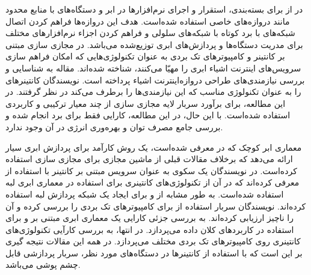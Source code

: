       در \cite{novo2015capillary} از  برای بسته‌بندی، استقرار و اجرای نرم‌افزار‌ها در ابر و دستگاه‌های با منابع محدود مانند دروازه‌های خاصی استفاده شده‌است.
      هدف این دروازه‌ها فراهم کردن اتصال شبکه‌های با برد کوتاه با شبکه‌های سلولی و فراهم کردن اجزاء نرم‌افزار‌های مختلف برای مدریت دستگاه‌ها و پردازش‌های ابری توزیع‌شده می‌باشد.
      در \cite{celesti2016exploring} مجازی سازی مبتنی بر کانتینر و کامپیوتر‌های تک بردی به عنوان تکنولوژی‌هایی که امکان فراهم سازی سرویس‌های اینترنت اشیاء ابری را مهیّا می‌کنند، شناخته شده‌اند.
      مقاله \cite{krylovskiy2015internet} به شناسایی و بررسی نیازمندی‌های طراحی دروازه‌اینترنت اشیاء پرداخته است.
      نویسندگان کانتینر‌های  را به عنوان تکنولوژی مناسب که این نیازمندی‌ها را برطرف می‌کند در نظر گرفتند.
      در این مطالعه، برای برآورد سربار لایه مجازی سازی از چند معیار ترکیبی و کاربردی استفاده شده‌است.
      با این حال، در این مطالعه، کارایی فقط برای برد  انجام شده و بررسی جامع مصرف توان و بهره‌وری انرژی در آن وجود ندارد.

      معماری ابر کوچک که در \cite{satyanarayanan2009case} معرفی شده‌است، یک روش کارآمد برای پردازش ابری سیار ارائه می‌دهد که برخلاف مقالات قبلی از ماشین مجازی برای مجازی سازی استفاده کرده‌است.
      در \cite{pahl2016container} نویسندگان یک سکوی به عنوان سرویس مبتنی بر کانتینر با استفاده از  معرفی کرده‌اند که در آن از تکنولوژی‌های کانتینری برای استفاده در معماری ابری لبه استفاده شده‌است.
      به طور مشابه \cite{bellavista2017feasibility} از  و  برای ایجاد یک شبکه پردازش لبه استفاده کرده‌اند.
      نویسندگان سربار استفاده از  برای کامپیوتر‌های تک بردی را بررسی کرده و آن را ناچیز ارزیابی کرده‌اند.
      \cite{hajji2016understanding} به بررسی جزئی کارایی یک معماری ابری مبتنی بر  و  برای استفاده در کاربرد‌های کلان داده می‌پردازد.
      در انتها، \cite{morabito2017virtualization} به بررسی کارآیی تکنولوژی‌های کانتینری روی کامپیوتر‌های تک بردی مختلف می‌پردازد.
      در همه این مقالات نتیجه گیری بر این است که با استفاده از کانتینر‌ها در دستگاه‌های مورد نظر، سربار پردازشی قابل چشم پوشی می‌باشد.
      